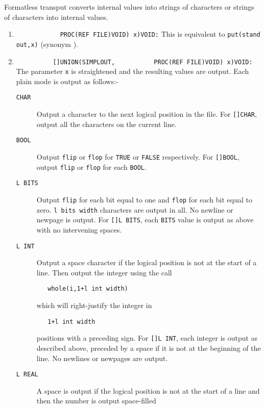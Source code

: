 Formatless transput converts internal values into strings of
characters or strings of characters into internal values.
\begin{enumerate}
\item {}\newline
\verb|            PROC(REF FILE)VOID) x)VOID:|\newline
This is equivalent to \verb|put(stand out,x)| (synonym ).
\item {}\newline
\verb|          []UNION(SIMPLOUT,|\newline
\verb|          PROC(REF FILE)VOID) x)VOID:|\newline
The parameter \verb|x| is straightened and the resulting values are
output. Each plain mode is output as follows:-
\begin{description}
\item[\texttt{CHAR}] Output a character to the next logical position in the
file. For \verb|[]CHAR|, output all the characters on the current
line.
\item[\texttt{BOOL}] Output \verb|flip| or \verb|flop| for \verb|TRUE| or
\verb|FALSE| respectively. For \verb|[]BOOL|, output \verb|flip| or
\verb|flop| for each \verb|BOOL|.
\item[\texttt{L BITS}] Output \verb|flip| for each bit equal to one and
\verb|flop| for each bit equal to zero. \verb|l bits width|
characters are output in all. No newline or newpage is output. For
\verb|[]L BITS|, each \verb|BITS| value is output as above with no
intervening spaces.
\item[\texttt{L INT}] Output a space character if the logical position is not
at the start of a line. Then output the integer using the call
\begin{verbatim}
   whole(i,1+l int width)
\end{verbatim}
\noindent
which will right-justify the integer in
\begin{verbatim}
   1+l int width
\end{verbatim}
\noindent
positions with a preceding sign. For \verb|[]L INT|, each integer is
output as described above, preceded by a space if it is not at the
beginning of the line. No newlines or newpages are output.
\item[\texttt{L REAL}] A space is output if the logical position is not at the
start of a line and then the number is output space-filled

\end{description}
\end{enumerate}
